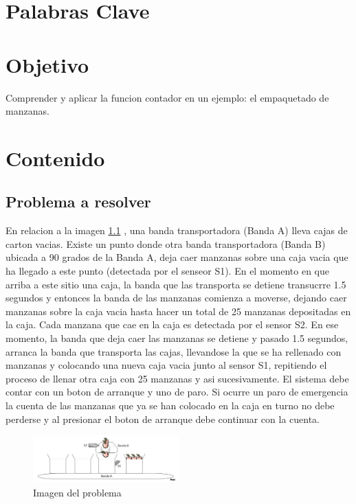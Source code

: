 \documentclass[12pt]{report}
\begin{document}
\tableofcontents
\newpage

\chapter*{Palabras Clave}
 



\newpage

\chapter*{Objetivo}
  Comprender y aplicar la funcion contador en un ejemplo: el empaquetado de manzanas.
\newpage

\chapter{Contenido}
\section{Problema a resolver}
  En relacion a la imagen \ref{fig:imagenProblema} , una banda transportadora (Banda A) lleva cajas de carton vacias. Existe un punto donde otra banda transportadora (Banda B) ubicada a 90 grados de la Banda A, 
  deja caer manzanas sobre una caja vacia que ha llegado a este punto (detectada por el senseor S1).  En el momento en que arriba a este sitio una caja, la banda que las transporta se detiene transucrre 1.5 segundos y entonces la banda de las manzanas comienza a moverse, dejando caer manzanas sobre la caja vacia hasta hacer un total de 25 manzanas depositadas en la caja. Cada manzana que cae en la caja es detectada por el sensor S2.
  En ese momento, la banda que deja caer las manzanas se detiene y pasado 1.5 segundos, arranca la banda que transporta las cajas, llevandose la que se ha rellenado con manzanas y colocando una nueva caja vacia junto al sensor S1, repitiendo el proceso de llenar otra caja con 25 manzanas y asi sucesivamente.
  El sistema debe contar con un boton de arranque y uno de paro. Si ocurre un paro de emergencia la cuenta de las manzanas que ya se han colocado en la caja en turno no debe perderse y al presionar el boton de arranque debe continuar con la cuenta.
  \begin{figure}[H]
    \centering
    \includegraphics[width=0.5\textwidth]{screenshots/imageProblema.png}
    \caption{Imagen del problema}
    \label{fig:imagenProblema}
  \end{figure}
\end{document}
